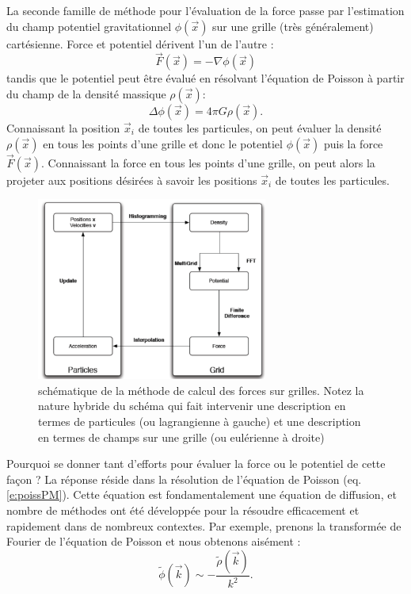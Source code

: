 La seconde famille de méthode pour l'évaluation de la force passe par l'estimation du champ potentiel gravitationnel $\phi(\vec x)$ sur une grille (très généralement) cartésienne. Force et potentiel dérivent l'un de l'autre :
\begin{equation}
\vec F (\vec x) =-\nabla \phi(\vec x)
\end{equation}
tandis que le potentiel peut être évalué en résolvant l'équation de Poisson à partir du champ de la densité massique $\rho(\vec x)$:
\begin{equation}
\Delta \phi(\vec x) = 4\pi G \rho(\vec x).
\label{e:poissPM}
\end{equation}
Connaissant la position $\vec x_i$ de toutes les particules, on peut évaluer la densité  $\rho(\vec x)$ en tous les points d'une grille et donc le potentiel $\phi(\vec x)$ puis la force $\vec F(\vec x)$. Connaissant la force en tous les points d'une grille, on peut alors la projeter aux positions désirées à savoir les positions $\vec x_i$ de toutes les particules.
\begin{figure}[htbp]
	\centering
		\includegraphics[height=6cm]{figs/PM.png}
	\caption{schématique de la méthode de calcul des forces sur grilles. Notez la nature hybride du schéma qui fait intervenir une description en termes de particules (ou lagrangienne à gauche) et une description en termes de champs sur une grille (ou eulérienne à droite)}
	\label{f:PM}
\end{figure}
Pourquoi se donner tant d'efforts pour évaluer la force ou le potentiel de cette façon ? La réponse réside dans la résolution de l'équation de Poisson (eq. \ref{e:poissPM}). Cette équation est fondamentalement une équation de diffusion, et nombre de méthodes ont été développée pour la résoudre efficacement et rapidement dans de nombreux contextes. Par exemple, prenons la transformée de Fourier de l'équation de Poisson et nous obtenons aisément : 
\begin{equation}
\tilde \phi(\vec k)\sim -\frac{\tilde \rho(\vec k)}{k^2}.
\end{equation} 
